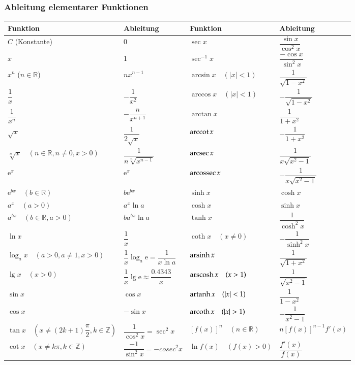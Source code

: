 \subsubsection{Ableitung elementarer Funktionen}
\renewcommand{\arraystretch}{2.2}
\begin{tabular}{|l|l||l|l|}
	\hline
	\textbf{Funktion} & \textbf{Ableitung} & \textbf{Funktion} &
	\textbf{Ableitung}\\\hline
	\hline $C$ (Konstante) & 0 & $\sec x$ & $\dfrac{\sin x}{\cos^2 x}$ \\
	\hline $x$ & 1 & $\sec^{-1} x$ & $\dfrac{-\cos x}{\sin^2 x}$\\
	\hline $x^n$ ($n\in\mathbb{R}$) & $nx^{n-1}$ & $\arcsin x \quad (|x| < 1)$ &
	$\dfrac{1}{\sqrt{1-x^2}}$\\
	\hline $\dfrac{1}{x}$ & $-\dfrac{1}{x^2}$ & $\arccos x \quad (|x| < 1)$ &
	$-\dfrac{1}{\sqrt{1-x^2}}$\\
	\hline $\dfrac{1}{x^n}$ & $-\dfrac{n}{x^{n+1}}$ & $\arctan x$ & $\dfrac{1}{1+x^2}$\\
	\hline $\sqrt{x}$ & $\dfrac{1}{2\sqrt{x}}$ & $\operatorname{arccot}{x} $ & $-\dfrac{1}{1+x^2}$\\
	\hline $\sqrt[n]{x}\quad (n\in\mathbb{R}, n \neq 0, x > 0)$ &
	$\dfrac{1}{n\sqrt[n]{x^{n-1}}}$ & $\operatorname{arcsec} x$ & $\dfrac{1}{x\sqrt{x^2-1}}$\\
	\hline $\mathrm{e}^x$ & $\mathrm{e}^x$ & $\operatorname{arcossec} x$ & $-\dfrac{1}{x\sqrt{x^2-1}}$\\
	\hline $\mathrm{e}^{bx}\quad (b\in\mathbb{R})$ & $b\mathrm{e}^{bx}$ & $\sinh x$ &
	$\cosh x$\\
	\hline $a^x\quad (a > 0)$ & $a^x\ln a$ & $\cosh x$ & $\sinh x$\\
	\hline $a^{bx}\quad (b\in\mathbb{R}, a > 0)$ & $ba^{bx}\ln a$ & $\tanh x$ &
	$\dfrac{1}{\cosh^2 x}$\\
	\hline $\ln x$ & $\dfrac{1}{x}$ & $\coth x \quad(x \neq 0)$ & $-\dfrac{1}{\sinh^2 x}$\\
	\hline $\log_a{x} \quad (a > 0, a \neq 1, x > 0)$ &
	$\dfrac{1}{x}\log_a{\mathrm{e}}=\dfrac{1}{x\ln a}$ & $\operatorname{arsinh} x$ &
	$\dfrac{1}{\sqrt{1+x^2}}$\\
	\hline $\lg x \quad (x > 0)$ & $\dfrac{1}{x}\lg \mathrm{e}\approx \dfrac{0.4343}{x}$
	& $\operatorname{arscosh} x \quad (x > 1)$ & $\dfrac{1}{\sqrt{x^2-1}}$\\
	\hline $\sin x$ & $\cos x$ & $\operatorname{artanh} x \quad (|x| < 1)$ & $\dfrac{1}{1-x^2}$\\
	\hline $\cos x$ & $-\sin x$ & $\operatorname{arcoth} x \quad (|x| > 1)$ & $-\dfrac{1}{x^2-1}$\\
	\hline $\tan x \quad (x\neq(2k+1)\dfrac{\pi}{2}, k\in\mathbb{Z})$ & $\dfrac{1}{\cos^2
		x}=\sec^2 x$ & $[f(x)]^n \quad (n\in\mathbb{R})$ & $n[f(x)]^{n-1}f'(x)$\\
	\hline $\cot x \quad (x\neq k\pi, k\in\mathbb{Z})$ & $\dfrac{-1}{\sin^2 x}=-cosec^2x$ & $\ln f(x) \quad (f(x)> 0)$ & $\dfrac{f'(x)}{f(x)}$\\
	\hline
\end{tabular}
\clearpage
\pagebreak
